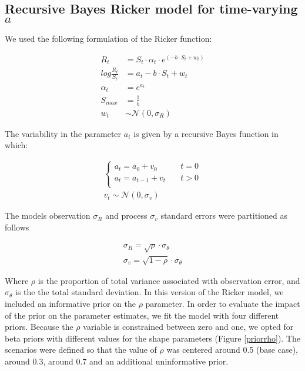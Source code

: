 \documentclass{article}
\begin{document}
\subsection{Recursive Bayes Ricker model for time-varying $a$}

We used the following formulation of the Ricker function:

\begin{align} 
R_t &= S_t \cdot \alpha_t \cdot e^{(-b\cdot S_t + w_t)}   \\ 
log\frac{R_t}{S_t} &= a_t-b\cdot S_t + w_t\\
\alpha_t &= e^{a_t} \\
S_{max} &= \frac{1}{b} \\
w_t &\sim \mathcal{N}(0,\sigma_R)
\end{align}


The variability in the parameter $a_t$ is given by a recursive Bayes function in which:

\begin{align} 
\begin{cases}
a_t = a_0 + v_0 &\quad t=0 \\
a_t = a_{t-1} + v_t &\quad t>0 \\
\end{cases}\\
v_t \sim \mathcal{N}(0,\sigma_v)
\end{align}

The models observation $\sigma_{R}$ and  process $\sigma_{v}$ standard errors were partitioned as follows


\begin{align} 
\sigma_{R}      = \sqrt{\rho} \cdot \sigma_{\theta}\\
\sigma_v        = \sqrt{1-\rho} \cdot \sigma_{\theta} 
\end{align}

Where $\rho$ is the proportion of total variance associated with observation error, and $\sigma_{\theta} $ is the the total standard deviation. In this version of the Ricker model, we included an informative prior on the $\rho$ parameter. In order to evaluate the impact of the prior on the parameter estimates, we fit the model with four different priors. Because the $\rho$ variable is constrained between zero and one, we opted for beta priors with different values for the shape parameters (Figure \ref{priorrho}). The scenarios were defined so that the value of $\rho$ was centered around 0.5 (base case), around 0.3, around 0.7 and an additional uninformative prior. 
\end{document}
